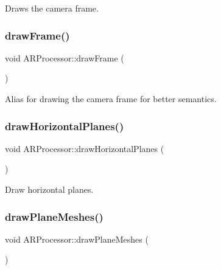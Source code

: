 Draws the camera frame. 

\mbox{\label{class_a_r_processor_a685469fa6b66b8b5d935f6f45a2ef599}} 
\subsubsection{\texorpdfstring{draw\+Frame()}{drawFrame()}}
{\footnotesize\ttfamily void A\+R\+Processor\+::draw\+Frame (\begin{DoxyParamCaption}{ }\end{DoxyParamCaption})}



Alias for drawing the camera frame for better semantics. 

\mbox{\label{class_a_r_processor_a6a61a7e03821410bc1a715fd32159662}} 
\subsubsection{\texorpdfstring{draw\+Horizontal\+Planes()}{drawHorizontalPlanes()}}
{\footnotesize\ttfamily void A\+R\+Processor\+::draw\+Horizontal\+Planes (\begin{DoxyParamCaption}{ }\end{DoxyParamCaption})}



Draw horizontal planes. 

\mbox{\label{class_a_r_processor_a516f256cd561a6f572f8741a2dec9c25}} 
\subsubsection{\texorpdfstring{draw\+Plane\+Meshes()}{drawPlaneMeshes()}}
{\footnotesize\ttfamily void A\+R\+Processor\+::draw\+Plane\+Meshes (\begin{DoxyParamCaption}{ }\end{DoxyParamCaption})}




